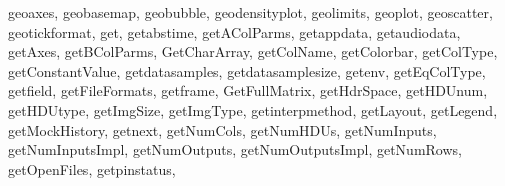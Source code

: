 {{        geoaxes,%
        geobasemap,%
        geobubble,%
        geodensityplot,%
        geolimits,%
        geoplot,%
        geoscatter,%
        geotickformat,%
        get,%
        getabstime,%
        getAColParms,%
        getappdata,%
        getaudiodata,%
        getAxes,%
        getBColParms,%
        GetCharArray,%
        getColName,%
        getColorbar,%
        getColType,%
        getConstantValue,%
        getdatasamples,%
        getdatasamplesize,%
        getenv,%
        getEqColType,%
        getfield,%
        getFileFormats,%
        getframe,%
        GetFullMatrix,%
        getHdrSpace,%
        getHDUnum,%
        getHDUtype,%
        getImgSize,%
        getImgType,%
        getinterpmethod,%
        getLayout,%
        getLegend,%
        getMockHistory,%
        getnext,%
        getNumCols,%
        getNumHDUs,%
        getNumInputs,%
        getNumInputsImpl,%
        getNumOutputs,%
        getNumOutputsImpl,%
        getNumRows,%
        getOpenFiles,%
        getpinstatus,%
}}
